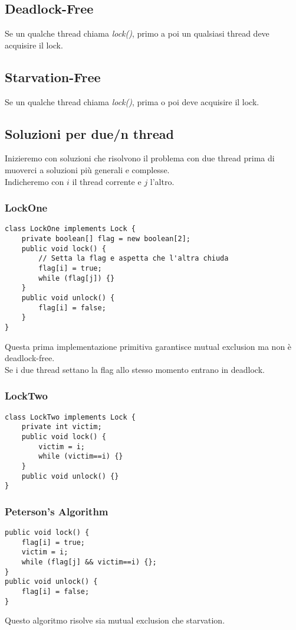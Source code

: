 \documentclass{article}
\begin{document}
\subsection{Deadlock-Free}
Se un qualche thread chiama \textit{lock()}, primo a poi un qualsiasi thread deve acquisire il lock.
\subsection{Starvation-Free}
Se un qualche thread chiama \textit{lock()}, prima o poi deve acquisire il lock.

\subsection{Soluzioni per due/n thread}
Inizieremo con soluzioni che risolvono il problema con due thread prima di muoverci a soluzioni più generali e complesse.\\
Indicheremo con $i$ il thread corrente e $j$ l'altro.

\subsubsection{LockOne}
\begin{lstlisting}
class LockOne implements Lock {
    private boolean[] flag = new boolean[2];
    public void lock() {
        // Setta la flag e aspetta che l'altra chiuda
        flag[i] = true;
        while (flag[j]) {}
    }
    public void unlock() {
        flag[i] = false;
    }
}
\end{lstlisting}

Questa prima implementazione primitiva garantisce mutual exclusion ma non è deadlock-free. \\
Se i due thread settano la flag allo stesso momento entrano in deadlock.

\subsubsection{LockTwo}
\begin{lstlisting}
class LockTwo implements Lock {
    private int victim;
    public void lock() {
        victim = i;
        while (victim==i) {}
    }
    public void unlock() {}
}
\end{lstlisting}

\subsubsection{Peterson's Algorithm}
\begin{lstlisting}
public void lock() {
    flag[i] = true;
    victim = i;
    while (flag[j] && victim==i) {};
}
public void unlock() {
    flag[i] = false;
}
\end{lstlisting}
Questo algoritmo risolve sia mutual exclusion che starvation.
\end{document}
